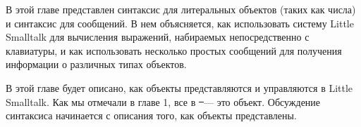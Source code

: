 \secdown

В этой главе представлен синтаксис для литеральных объектов (таких как числа) 
и синтаксис для сообщений. В нем объясняется, как использовать систему Little Smalltalk 
для вычисления выражений, набираемых непосредственно с клавиатуры, и как использовать 
несколько простых сообщений для получения информации о различных типах объектов.

\bigskip

В этой главе будет описано, как объекты представляются и 
управляются в Little Smalltalk. Как мы отмечали в главе 1, 
все в \st\ --- это объект. Обсуждение синтаксиса начинается 
с описания того, как объекты представлены.




\secup
